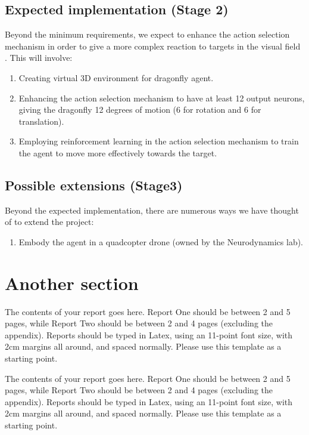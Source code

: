 \documentclass[a4paper,11pt]{article}
\begin{document}
 	\subsection{Expected implementation (Stage 2)}
 	
 	Beyond the minimum requirements, we expect to enhance the action selection mechanism in order to give a more complex reaction to targets in the visual field . This will involve:
 \begin{enumerate}
 	\item Creating virtual 3D environment for dragonfly agent.
 	\item Enhancing the action selection mechanism to have at least 12 output neurons, giving the dragonfly 12 degrees of motion (6 for rotation and 6 for translation).
 	\item Employing reinforcement learning in the action selection mechanism to train the agent to move more effectively towards the target.
 \end{enumerate}
 
 	\subsection{Possible extensions (Stage3)}
 	
 	Beyond the expected implementation, there are numerous ways we have thought of to extend the project:
 \begin{enumerate}
 	\item Embody the agent in a quadcopter drone (owned by the Neurodynamics lab).
 \end{enumerate}

\section{Another section}

The contents of your report goes here.  Report One should be between 2
and 5 pages, while Report Two should be between 2 and 4 pages
(excluding the appendix).  Reports should be typed in Latex, using an
11-point font size, with 2cm margins all around, and spaced normally.
Please use this template as a starting point.

The contents of your report goes here.  Report One should be between 2
and 5 pages, while Report Two should be between 2 and 4 pages
(excluding the appendix).  Reports should be typed in Latex, using an
11-point font size, with 2cm margins all around, and spaced normally.
Please use this template as a starting point.
\end{document}
